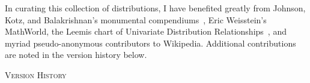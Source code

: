 


\clearpage



In curating this collection of distributions, I have benefited greatly from Johnson, Kotz, and Balakrishnan's monumental compendiums~\cite{Johnson1994, Johnson1995}, Eric Weisstein's MathWorld, the Leemis chart of Univariate Distribution Relationships~\cite{Leemis2008, Leemis2012}, and myriad pseudo-anonymous contributors to Wikipedia. Additional contributions are noted in the version history below.



\begin{center}
\textsc{Version History}
\end{center}

